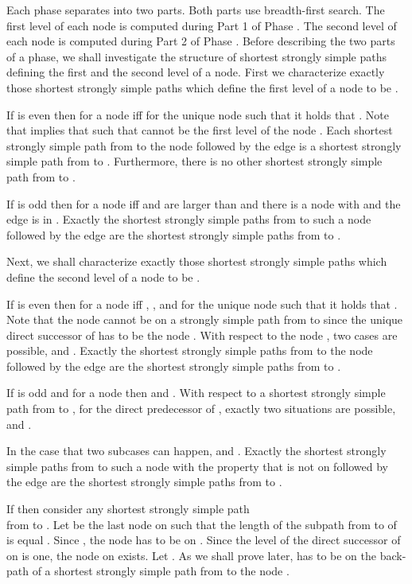 \documentclass[12pt,twoside,a4paper]{article}
\begin{document}
Each phase separates into two parts. Both parts use breadth-first search.
The first level of each node  is computed during Part 1 of Phase .
The second level of each node  is computed during Part 2 of Phase
. Before describing the two parts of a phase,
we shall investigate the structure of shortest strongly simple paths defining the first 
and the second level of a node.
First we characterize exactly those shortest strongly simple paths which define
the first level of a node to be . 

\medskip
If  is even then  for a node  iff for the unique node 
 such that  it holds that . 
Note that  implies that  such that  cannot 
be the first level of the node . Each shortest strongly simple path from  to the
node  followed by the edge  is a shortest strongly simple path
from  to . Furthermore, there is no other shortest strongly simple path from
 to .

If  is odd then  for a node  iff  and 
 are larger than  and there is a node  with 
and the edge  is in . Exactly the shortest strongly simple paths
from  to such a node  followed by the edge  are
the shortest strongly simple paths from  to .

\medskip
Next, we shall characterize exactly those shortest strongly simple paths which define
the second level of a node to be . 

\medskip
If  is even then  for a node  iff ,
, and for the unique node  such that  
it holds that . Note that the node  cannot be on a strongly simple
path from  to  since the unique direct successor of  has to be the node
. With respect to the node , two cases
are possible,  and . Exactly the shortest 
strongly simple paths from  to the node  followed by the edge 
are the shortest strongly simple paths from  to .

If  is odd and  for a node  then  and 
. With respect to a shortest strongly simple path  from  to ,
for the direct predecessor  of , exactly two situations are possible,
 and .

In the case that  two subcases can happen,  and
. Exactly the shortest strongly simple paths  from  to such a 
node  with the property that  is not on  followed by the edge 
 are the shortest strongly simple paths from  to .

If  then consider any shortest strongly simple path\\  from 
 to . Let  be the last node on  such that the length of the subpath
from  to  of  is equal . Since ,
the node  has to be on . Since the level of the direct successor of  on  is
one, the node  on  exists. 
Let . As we shall prove later,
 has to be on the back-path of a shortest strongly simple path from 
to the node .
\end{document}
